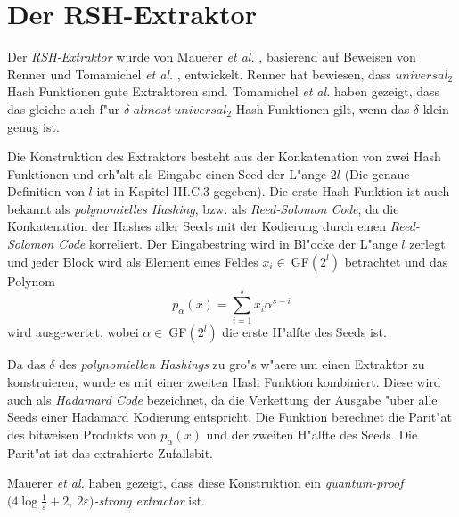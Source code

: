 \section{Der RSH-Extraktor}


Der \emph{RSH-Extraktor} wurde von Mauerer \emph{et al.} \cite{mauerer2012modular}, basierend auf Beweisen von Renner \cite{renner2008security} und Tomamichel \emph{et al.} \cite{tomamichel2011leftover}, entwickelt. Renner hat bewiesen, dass $universal_2$ Hash Funktionen gute Extraktoren sind. Tomamichel \emph{et al.} haben gezeigt, dass das gleiche auch f"ur $\delta$-$almost\ universal_2$ Hash Funktionen gilt, wenn das $\delta$ klein genug ist.

Die Konstruktion des Extraktors besteht aus der Konkatenation von zwei Hash Funktionen und erh"alt als Eingabe einen Seed der L"ange $2l$ (Die genaue Definition von $l$ ist in \cite{mauerer2012modular} Kapitel III.C.3 gegeben). Die erste Hash Funktion ist auch bekannt als \emph{polynomielles Hashing}, bzw. als \emph{Reed-Solomon Code}, da die Konkatenation der Hashes aller Seeds mit der Kodierung durch einen \emph{Reed-Solomon Code} korreliert. Der Eingabestring wird in Bl"ocke der L"ange $l$ zerlegt und jeder Block wird als Element eines Feldes $x_i \in\ $GF$(2^l)$ betrachtet und das Polynom
\begin{equation}
	p_\alpha(x) = \sum_{i=1}^{s} x_i \alpha ^{s-i}
\end{equation}
wird ausgewertet, wobei $\alpha \in\ $GF$(2^l)$ die erste H"alfte des Seeds ist.

Da das $\delta$ des \emph{polynomiellen Hashings} zu gro"s w"aere um einen Extraktor zu konstruieren, wurde es mit einer zweiten Hash Funktion kombiniert. Diese wird auch als \emph{Hadamard Code} bezeichnet, da die Verkettung der Ausgabe "uber alle Seeds einer Hadamard Kodierung entspricht. Die Funktion berechnet die Parit"at des bitweisen Produkts von $p_\alpha(x)$ und der zweiten H"alfte des Seeds. Die Parit"at ist das extrahierte Zufallsbit.

Mauerer \emph{et al.} haben gezeigt, dass diese Konstruktion ein \emph{quantum-proof $(4 \log \frac{1}{\varepsilon} + 2$, $2\varepsilon)$-strong extractor} ist.